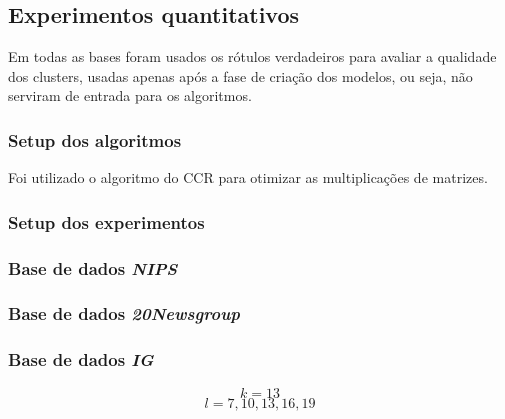 \documentclass[
    12pt,                %
    oneside,            %
    a4paper,            %
    english,            %
    brazil                %
    ]{abntex2ppgsi}
\begin{document}

\subsection{Experimentos quantitativos}
\label{subsec:experiments-quant}

Em todas as bases foram usados os rótulos verdadeiros para avaliar a qualidade dos clusters, usadas apenas após a fase de criação dos modelos, ou seja, não serviram de entrada para os algoritmos.

\subsubsection{Setup dos algoritmos}

Foi utilizado o algoritmo do CCR para otimizar as multiplicações de matrizes.

\subsubsection{Setup dos experimentos}

\subsubsection{Base de dados \textit{\textbf{NIPS}}}

\subsubsection{Base de dados \textit{\textbf{20Newsgroup}}}

\subsubsection{Base de dados \textit{\textbf{IG}}}
\label{subsec:experiments-quant:ig}

$$k = 13$$
$$l = 7, 10, 13, 16, 19$$
\end{document}
